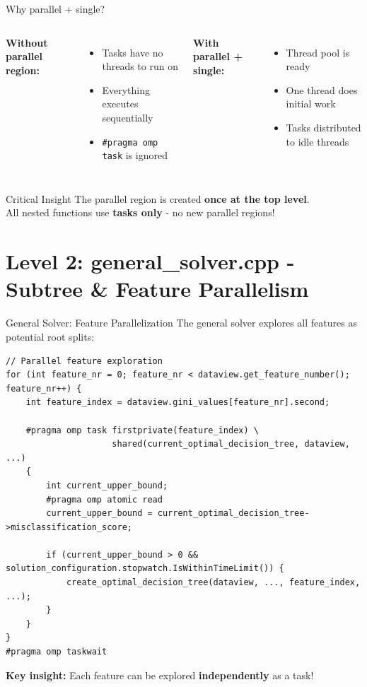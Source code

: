 \documentclass{beamer}
\begin{document}
\begin{frame}{Why parallel + single?}
\begin{columns}
\textbf{Without parallel region:}
\begin{itemize}
    \item Tasks have no threads to run on
    \item Everything executes sequentially
    \item \texttt{\#pragma omp task} is ignored
\end{itemize}

\textbf{With parallel + single:}
\begin{itemize}
    \item Thread pool is ready
    \item One thread does initial work
    \item Tasks distributed to idle threads
\end{itemize}
\end{columns}

\vspace{1em}
\begin{alertblock}{Critical Insight}
The parallel region is created \textbf{once at the top level}.\\
All nested functions use \textbf{tasks only} - no new parallel regions!
\end{alertblock}
\end{frame}

\section{Level 2: general\_solver.cpp - Subtree \& Feature Parallelism}

\begin{frame}[fragile]{General Solver: Feature Parallelization}
The general solver explores all features as potential root splits:
\begin{lstlisting}
// Parallel feature exploration 
for (int feature_nr = 0; feature_nr < dataview.get_feature_number(); feature_nr++) {
    int feature_index = dataview.gini_values[feature_nr].second;
    
    #pragma omp task firstprivate(feature_index) \
                     shared(current_optimal_decision_tree, dataview, ...)
    {
        int current_upper_bound;
        #pragma omp atomic read
        current_upper_bound = current_optimal_decision_tree->misclassification_score;
        
        if (current_upper_bound > 0 && solution_configuration.stopwatch.IsWithinTimeLimit()) {
            create_optimal_decision_tree(dataview, ..., feature_index, ...);
        }
    }
}
#pragma omp taskwait
\end{lstlisting}

\textbf{Key insight:} Each feature can be explored \textbf{independently} as a task!
\end{frame}
\end{document}
